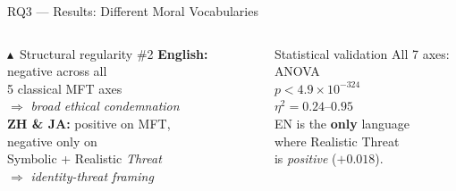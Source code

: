 \documentclass[aspectratio=169,10pt]{beamer}
\newcommand{\faExclamationTriangle}{$\blacktriangle$}
\begin{document}
\begin{frame}{RQ3 --- Results: Different Moral Vocabularies}
\begin{columns}[T]
      \vspace{4pt}
      \begin{alertblock}{\faExclamationTriangle\ Structural regularity \#2}
        \textbf{English:} negative across all\\
        5 classical MFT axes\\
        $\Rightarrow$ \emph{broad ethical condemnation}\\[8pt]
        \textbf{ZH \& JA:} positive on MFT,\\
        negative only on\\
        Symbolic + Realistic \emph{Threat}\\
        $\Rightarrow$ \emph{identity-threat framing}
      \end{alertblock}
      \begin{block}{Statistical validation}
        \footnotesize
        All 7 axes: ANOVA\\
        $p < 4.9 \times 10^{-324}$\\
        $\eta^2 = 0.24$--$0.95$\\[4pt]
        EN is the \textbf{only} language\\
        where Realistic Threat\\
        is \emph{positive} ($+0.018$).
      \end{block}
  \end{columns}
\end{frame}
\end{document}
